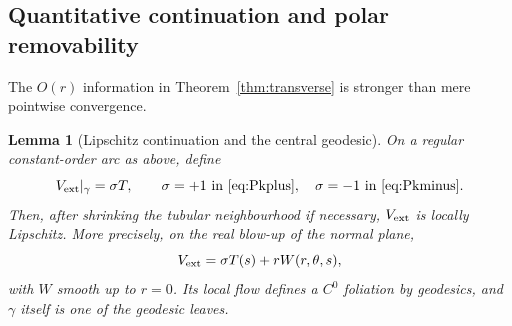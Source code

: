 \documentclass[aps,prd,reprint,nofootinbib,superscriptaddress]{revtex4-2}
\newtheorem{lemma}[theorem]{Lemma}
\theoremstyle{definition}
\theoremstyle{remark}
\begin{document}
\subsection{Quantitative continuation and polar removability}

The $O(r)$ information in Theorem~\ref{thm:transverse} is stronger than mere pointwise convergence.

\begin{lemma}[Lipschitz continuation and the central geodesic]
\label{lem:lipschitz}
On a regular constant-order arc as above, define
\[
V_{\rm ext}|_\gamma=\sigma T,
\qquad \sigma=+1\ \text{in \eqref{eq:Pkplus}},\quad
\sigma=-1\ \text{in \eqref{eq:Pkminus}}.
\]
Then, after shrinking the tubular neighbourhood if necessary, $V_{\rm ext}$ is locally Lipschitz. More precisely, on the real blow-up of the normal plane,
\begin{equation}
V_{\rm ext}=\sigma T(s)+rW(r,\theta,s),
\label{eq:blowupV}
\end{equation}
with $W$ smooth up to $r=0$. Its local flow defines a $C^0$ foliation by geodesics, and $\gamma$ itself is one of the geodesic leaves.
\end{lemma}
\end{document}

